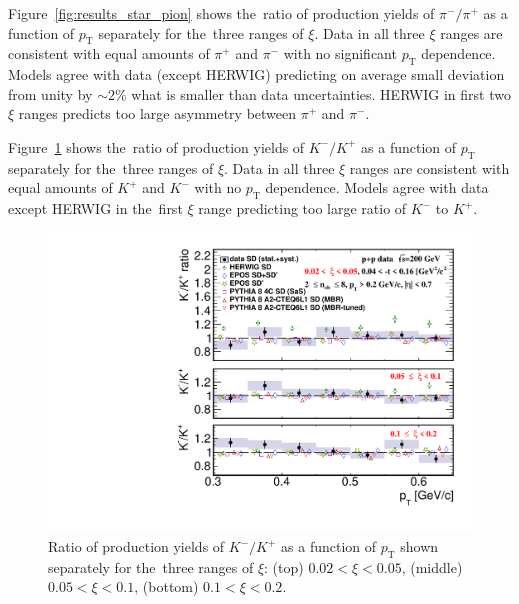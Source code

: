 Figure~\ref{fig:results_star_pion} shows the~ratio of production yields of $\pi^-/\pi^+$ as a function of $p_\textrm{T}$  separately for the~three ranges of $\xi$. Data in all three $\xi$ ranges are consistent with equal amounts of $\pi^+$ and $\pi^-$ with no significant $p_\textrm{T}$ dependence. Models agree with data (except HERWIG) predicting on average small deviation from unity by $\sim2\%$ what is smaller than data uncertainties. HERWIG in first two $\xi$ ranges predicts too large asymmetry between $\pi^+$ and $\pi^-$.

Figure~\ref{fig:results_star_kaon} shows the~ratio of production yields of $K^- / K^+$ as a function of $p_\textrm{T}$  separately for the~three ranges of $\xi$. Data in all three $\xi$  ranges are consistent with equal amounts of $K^+$ and $K^-$ with no $p_\textrm{T}$ dependence. Models agree with data except HERWIG in the~first $\xi$  range predicting too large ratio of $K^-$ to $K^+$.
\begin{figure}[b!]
	\centering
	\includegraphics[width=.99\textwidth,page=1]{chapters/chrgSTAR/img/results/particleRatio_prt_1.pdf}
	\caption{Ratio of production yields of $K^-/K^+$ as a function of $p_\textrm{T}$ shown separately for the~three ranges of $\xi$: (top) $0.02<\xi<0.05$, (middle) $0.05<\xi<0.1$, (bottom) $0.1<\xi<0.2$.}
	\label{fig:results_star_kaon}
	
\end{figure}

